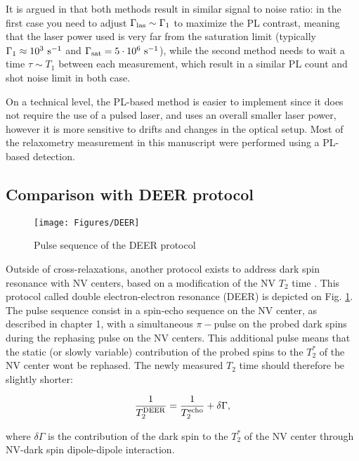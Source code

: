 \documentclass[a4paper]{report}
\begin{document}
It is argued in \citep{finco2021imaging} that both methods result in similar signal to noise ratio: in the first case you need to adjust $\Gamma_{\rm las} \sim \Gamma_1$ to maximize the PL contrast, meaning that the laser power used is very far from the saturation limit (typically $\Gamma_1 \approx 10^3\ \rm s^{-1}$ and $\Gamma_{\rm sat} = 5\cdot10^6\ \rm s^{-1}$\citep{dreau2011avoiding}), while the second method needs to wait a time $\tau \sim T_1$ between each measurement, which result in a similar PL count and shot noise limit in both case.

On a technical level, the PL-based method is easier to implement since it does not require the use of a pulsed laser, and uses an overall smaller laser power, however it is more sensitive to drifts and changes in the optical setup. Most of the relaxometry measurement in this manuscript were performed using a PL-based detection.

\subsection{Comparison with DEER protocol}

\begin{figure}
\centering
\texttt{[image: Figures/DEER]}
\caption{Pulse sequence of the DEER protocol}
\label{DEER}
\end{figure}

Outside of cross-relaxations, another protocol exists to address dark spin resonance with NV centers, based on a modification of the NV $T_2$ time \citep{serbyn2014interferometric}. This protocol called double electron-electron resonance (DEER) is depicted on Fig. \ref{DEER}. The pulse sequence consist in a spin-echo sequence on the NV center, as described in chapter 1, with a simultaneous $\pi-$pulse on the probed dark spins during the rephasing pulse on the NV centers. This additional pulse means that the static (or slowly variable) contribution of the probed spins to the $T_2^*$ of the NV center wont be rephased. The newly measured $T_2$ time should therefore be slightly shorter:

\begin{equation}
\frac{1}{T_2^{\rm DEER}}=\frac{1}{T_2^{\rm echo}} + \delta \Gamma,
\end{equation}

where $\delta \Gamma$ is the contribution of the dark spin to the $T_2^*$ of the NV center through NV-dark spin dipole-dipole interaction.
\end{document}
